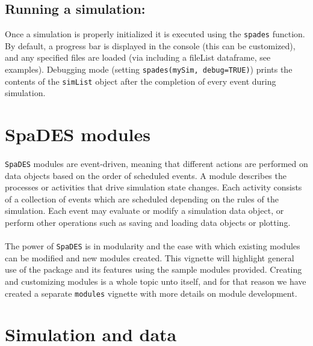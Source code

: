 \documentclass{article}
\begin{document}
\subsection{Running a simulation:}
Once a simulation is properly initialized it is executed using the \texttt{spades} function. By default, a progress bar is displayed in the console (this can be customized), and any specified files are loaded (via including a fileList dataframe, see examples). Debugging mode (setting \texttt{spades(mySim, debug=TRUE)}) prints the contents of the \texttt{simList} object after the completion of every event during simulation.

\newpage

\section{SpaDES modules}

\paragraph{}
\texttt{SpaDES} modules are event-driven, meaning that different actions are performed on data objects based on the order of scheduled events. A module describes the processes or activities that drive simulation state changes. Each activity consists of a collection of events which are scheduled depending on the rules of the simulation. Each event may evaluate or modify a simulation data object, or perform other operations such as saving and loading data objects or plotting.

\paragraph{}
The power of \texttt{SpaDES} is in modularity and the ease with which existing modules can be modified and new modules created. This vignette will highlight general use of the package and its features using the sample modules provided. Creating and customizing modules is a whole topic unto itself, and for that reason we have created a separate \texttt{modules} vignette with more details on module development.

\section{Simulation and data}
\end{document}
